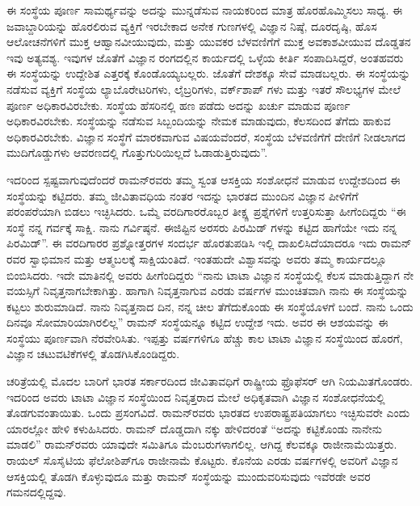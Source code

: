 ಈ ಸಂಸ್ಥೆಯ ಪೂರ್ಣ ಸಾಮರ್ಥ್ಯವನ್ನು ಅದನ್ನು ಮುನ್ನಡೆಸುವ ನಾಯಕರಿಂದ ಮಾತ್ರ ಹೊರಹೊಮ್ಮಿಸಲು ಸಾಧ್ಯ. ಈ ಜವಾಬ್ದಾರಿಯನ್ನು ಹೊರಲಿರುವ ವ್ಯಕ್ತಿಗೆ ಇರಬೇಕಾದ ಅನೇಕ ಗುಣಗಳಲ್ಲಿ ವಿಜ್ಞಾನ ನಿಷ್ಠೆ, ದೂರದೃಷ್ಠಿ, ಹೊಸ ಆಲೋಚನೆಗಳಿಗೆ ಮುಕ್ತ ಆಹ್ವಾನವೀಯುವುದು, ಮತ್ತು ಯುವಕರ ಬೆಳವಣಿಗೆಗೆ ಮುಕ್ತ ಅವಕಾಶವೀಯುವ ದೊಡ್ಡತನ ಇವು ಅತ್ಯವಶ್ಯ. ಇವುಗಳ ಜೊತೆಗೆ ವಿಜ್ಞಾನ ರಂಗದಲ್ಲಿನ ಕಾರ್ಯದಲ್ಲಿ ಒಳ್ಳೆಯ ಕೀರ್ತಿ ಸಂಪಾದಿಸಿದ್ದರೆ, ಅಂತಹವರು ಈ ಸಂಸ್ಥೆಯನ್ನು ಉದ್ದೇಶಿತ ಎತ್ತರಕ್ಕೆ ಕೊಂಡೊಯ್ಯಬಲ್ಲರು. ಜೊತೆಗೆ ದೇಶಕ್ಕೂ ಸೇವೆ ಮಾಡಬಲ್ಲರು. ಈ ಸಂಸ್ಥೆಯನ್ನು ನಡೆಸುವ ವ್ಯಕ್ತಿಗೆ ಸಂಸ್ಥೆಯ ಲ್ಯಾಬೊರೇಟರಿಗಳು, ಲೈಬ್ರರಿಗಳು, ವರ್ಕ್‌ಶಾಪ್ ಗಳು ಮತ್ತು ಇತರೆ ಸೌಲಭ್ಯಗಳ ಮೇಲೆ ಪೂರ್ಣ ಅಧಿಕಾರವಿರಬೇಕು. ಸಂಸ್ಥೆಯ ಹೆಸರಿನಲ್ಲಿ ಹಣ ಪಡೆದು ಅದನ್ನು ಖರ್ಚು ಮಾಡುವ ಪೂರ್ಣ ಅಧಿಕಾರವಿರಬೇಕು. ಸಂಸ್ಥೆಯನ್ನು ನಡೆಸುವ ಸಿಬ್ಬಂದಿಯನ್ನು ನೇಮಕ ಮಾಡುವುದು, ಕೆಲಸದಿಂದ ತೆಗೆದು ಹಾಕುವ ಅಧಿಕಾರವಿರಬೇಕು. ವಿಜ್ಞಾನ ಸಂಸ್ಥೆಗೆ ಮಾರಕವಾಗುವ ವಿಷಯವೆಂದರೆ, ಸಂಸ್ಥೆಯ ಬೆಳವಣಿಗೆಗೆ ದೇಣಿಗೆ ನೀಡಲಾಗದ ಮುದಿಗೊಡ್ಡುಗಳು ಆವರಣದಲ್ಲಿ ಗೊತ್ತುಗುರಿಯಿಲ್ಲದೆ ಓಡಾಡುತ್ತಿರುವುದು”.

ಇದರಿಂದ ಸ್ಪಷ್ಟವಾಗುವುದೆಂದರೆ ರಾಮನ್‍ರವರು ತಮ್ಮ ಸ್ವಂತ ಆಸಕ್ತಿಯ ಸಂಶೋಧನೆ ಮಾಡುವ ಉದ್ದೇಶದಿಂದ ಈ ಸಂಸ್ಥೆಯನ್ನು ಕಟ್ಟಿದರು. ತಮ್ಮ ಜೀವಿತಾವಧಿಯ ನಂತರ ಇದನ್ನು ಭಾರತದ ಮುಂದಿನ ವಿಜ್ಞಾನ ಪೀಳಿಗೆಗೆ ಪರಂಪರೆಯಾಗಿ ಬಿಡಲು ಇಚ್ಛಿಸಿದರು. ಒಮ್ಮೆ ವರದಿಗಾರರೊಬ್ಬರ ತೀಕ್ಷ್ಣ ಪ್ರಶ್ನೆಗಳಿಗೆ ಉತ್ತರಿಸುತ್ತಾ ಹೀಗೆಂದಿದ್ದರು “ಈ ಸಂಸ್ಥೆ ನನ್ನ ಗರ್ವಕ್ಕೆ ಸಾಕ್ಷಿ. ನಾನು ಗರ್ವಿಷ್ಠನೆ. ಈಜಿಪ್ಟಿನ ಅರಸರು ಪಿರಮಿಡ್ ಗಳನ್ನು ಕಟ್ಟಿದ ಹಾಗೆಯೇ ಇದು ನನ್ನ ಪಿರಮಿಡ್”. ಈ ವರದಿಗಾರರ ಪ್ರಶ್ನೋತ್ತರಗಳ ಸಂದರ್ಭ ಹೊರತುಪಡಿಸಿ ಇಲ್ಲಿ ದಾಖಲಿಸಿದೆಯಾದರೂ ಇದು ರಾಮನ್ ರವರ ಸ್ವಾಭಿಮಾನ ಮತ್ತು ಆತ್ಮಬಲಕ್ಕೆ ಸಾಕ್ಷಿಯಂತಿದೆ. ಇಂತಹುದೇ ವಿಶ್ವಾಸವನ್ನು ಅವರು ತಮ್ಮ ಕಾರ್ಯದಲ್ಲೂ ಬಿಂಬಿಸಿದರು. ಇದೇ ಮಾತಿನಲ್ಲಿ ಅವರು ಹೀಗೆಂದಿದ್ದರು “ನಾನು ಟಾಟಾ ವಿಜ್ಞಾನ ಸಂಸ್ಥೆಯಲ್ಲಿ ಕೆಲಸ ಮಾಡುತ್ತಿದ್ದಾಗ ನೇ ವಯಸ್ಸಿಗೆ ನಿವೃತ್ತನಾಗಬೇಕಾಗಿತ್ತು. ಹಾಗಾಗಿ ನಿವೃತ್ತನಾಗುವ ಎರಡು ವರ್ಷಗಳ ಮುಂಚಿತವಾಗಿ ನಾನು ಈ ಸಂಸ್ಥೆಯನ್ನು ಕಟ್ಟಲು ಶುರುಮಾಡಿದೆ. ನಾನು ನಿವೃತ್ತನಾದ ದಿನ, ನನ್ನ ಚೀಲ ತೆಗೆದುಕೊಂಡು ಈ ಸಂಸ್ಥೆಯೊಳಗೆ ಬಂದೆ. ನಾನು ಒಂದು ದಿನವೂ ಸೋಮಾರಿಯಾಗಿರಲಿಲ್ಲ” ರಾಮನ್ ಸಂಸ್ಥೆಯನ್ನೂ ಕಟ್ಟಿದ ಉದ್ದೇಶ ಇದು. ಅವರ ಈ ಆಶಯವನ್ನು ಈ ಸಂಸ್ಥೆಯು ಪೂರ್ಣವಾಗಿ ನೆರವೇರಿಸಿತು. ಇಪ್ಪತ್ತು ವರ್ಷಗಳಿಗೂ ಹೆಚ್ಚು ಕಾಲ ಟಾಟಾ ವಿಜ್ಞಾನ ಸಂಸ್ಥೆಯಿಂದ ಹೊರಗೆ, ವಿಜ್ಞಾನ ಚಟುವಟಿಕೆಗಳಲ್ಲಿ ತೊಡಗಿಸಿಕೊಂಡಿದ್ದರು.

ಚರಿತ್ರೆಯಲ್ಲಿ ಮೊದಲ ಬಾರಿಗೆ ಭಾರತ ಸರ್ಕಾರದಿಂದ ಜೀವಿತಾವಧಿಗೆ ರಾಷ್ಟ್ರೀಯ ಫ್ರೊಫೆಸರ್ ಆಗಿ ನಿಯಮಿತಗೊಂಡರು. ಇದರಿಂದ ಅವರು ಟಾಟಾ ವಿಜ್ಞಾನ ಸಂಸ್ಥೆಯಿಂದ ನಿವೃತ್ತರಾದ ಮೇಲೆ ಅಧಿಕೃತವಾಗಿ ವಿಜ್ಞಾನ ಸಂಶೋಧನೆಯಲ್ಲಿ ತೊಡಗುವಂತಾಯಿತು. ಒಂದು ಪ್ರಸಂಗವಿದೆ. ರಾಮನ್‍ರವರು ಭಾರತದ ಉಪರಾಷ್ಟ್ರಪತಿಯಾಗಲು ಇಚ್ಛಿಸುವರೇ ಎಂದು ಯಾರಲ್ಲೋ ಹೇಳಿ ಕಳುಹಿಸಿದರು. ರಾಮನ್ ದೊಡ್ಡದಾಗಿ ನಕ್ಕು ಹೇಳಿದರಂತೆ “ಅದನ್ನು ಕಟ್ಟಿಕೊಂಡು ನಾನೇನು ಮಾಡಲಿ” ರಾಮನ್‍ರವರು ಯಾವುದೇ ಸಮಿತಿಗೂ ಮೆಂಬರುಗಳಾಗಲಿಲ್ಲ. ಆಗಿದ್ದ ಕೆಲವಕ್ಕೂ ರಾಜೀನಾಮೆಯಿತ್ತರು. ರಾಯಲ್ ಸೊಸೈಟಿಯ ಫೆಲೋಶಿಪ್‍ಗೂ ರಾಜೀನಾಮೆ ಕೊಟ್ಟರು. ಕೊನೆಯ ಎರಡು ವರ್ಷಗಳಲ್ಲಿ ಅವರಿಗೆ ವಿಜ್ಞಾನ ಆಸಕ್ತಿಯಲ್ಲಿ ತೊಡಗಿ ಕೊಳ್ಳುವುದೂ ಮತ್ತು ರಾಮನ್ ಸಂಸ್ಥೆಯನ್ನು ಮುಂದುವರಿಸುವುದು ಇವೆರಡೇ ಅವರ ಗಮನದಲ್ಲಿದ್ದವು.

